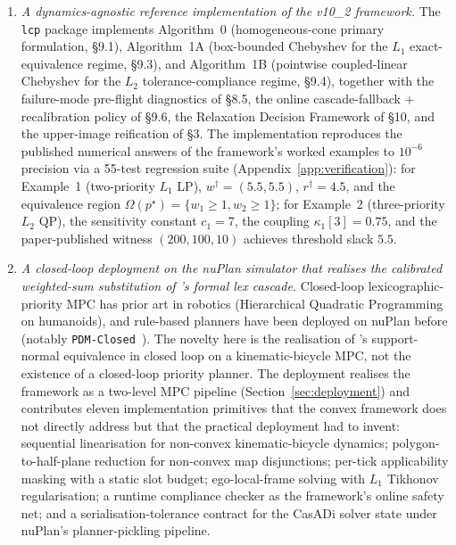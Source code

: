 \begin{enumerate}
    \item \emph{A dynamics-agnostic reference implementation of the v10\_2 framework.} The \texttt{lcp} package implements Algorithm~0 (homogeneous-cone primary formulation, \cite{lcp2025} \S9.1), Algorithm~1A (box-bounded Chebyshev for the $L_1$ exact-equivalence regime, \cite{lcp2025} \S9.3), and Algorithm~1B (pointwise coupled-linear Chebyshev for the $L_2$ tolerance-compliance regime, \cite{lcp2025} \S9.4), together with the failure-mode pre-flight diagnostics of \cite{lcp2025} \S8.5, the online cascade-fallback + recalibration policy of \cite{lcp2025} \S9.6, the Relaxation Decision Framework of \cite{lcp2025} \S10, and the upper-image reification of \cite{lcp2025} \S3. The implementation reproduces the published numerical answers of the framework's worked examples to $10^{-6}$ precision via a 55-test regression suite (Appendix~\ref{app:verification}): for Example~1 (two-priority $L_1$ LP), $w^\dagger = (5.5, 5.5)$, $r^\dagger = 4.5$, and the equivalence region $\Omega(p^\star) = \{w_1 \ge 1, w_2 \ge 1\}$; for Example~2 (three-priority $L_2$ QP), the sensitivity constant $c_1 = 7$, the coupling $\kappa_1[3] = 0.75$, and the paper-published witness $(200, 100, 10)$ achieves threshold slack $5.5$.

    \item \emph{A closed-loop deployment on the nuPlan simulator that realises the calibrated weighted-sum substitution of \cite{lcp2025}'s formal lex cascade.} Closed-loop lexicographic-priority MPC has prior art in robotics (Hierarchical Quadratic Programming~\cite{escande2014hqp} on humanoids), and rule-based planners have been deployed on nuPlan before (notably \texttt{PDM-Closed}~\cite{dauner2023pdm}). The novelty here is the realisation of \cite{lcp2025}'s support-normal equivalence in closed loop on a kinematic-bicycle MPC, not the existence of a closed-loop priority planner. The deployment realises the framework as a two-level MPC pipeline (Section~\ref{sec:deployment}) and contributes eleven implementation primitives that the convex framework does not directly address but that the practical deployment had to invent: sequential linearisation for non-convex kinematic-bicycle dynamics; polygon-to-half-plane reduction for non-convex map disjunctions; per-tick applicability masking with a static slot budget; ego-local-frame solving with $L_1$ Tikhonov regularisation; a runtime compliance checker as the framework's online safety net; and a serialisation-tolerance contract for the CasADi solver state under nuPlan's planner-pickling pipeline.


\end{enumerate}
